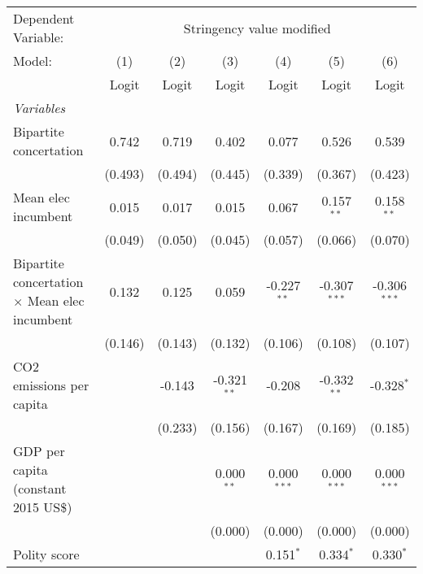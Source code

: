 
\begingroup
\centering
\begin{tabular}{lcccccc}
   \toprule
   Dependent Variable: & \multicolumn{6}{c}{Stringency value modified}\\
   Model:                                               & (1)     & (2)     & (3)           & (4)           & (5)            & (6)\\  
                                                        &  Logit  & Logit   & Logit         & Logit         & Logit          & Logit\\  
   \midrule
   \emph{Variables}\\
   Bipartite concertation                               & 0.742   & 0.719   & 0.402         & 0.077         & 0.526          & 0.539\\   
                                                        & (0.493) & (0.494) & (0.445)       & (0.339)       & (0.367)        & (0.423)\\   
   Mean elec incumbent                                  & 0.015   & 0.017   & 0.015         & 0.067         & 0.157$^{**}$   & 0.158$^{**}$\\   
                                                        & (0.049) & (0.050) & (0.045)       & (0.057)       & (0.066)        & (0.070)\\   
   Bipartite concertation $\times$ Mean elec incumbent  & 0.132   & 0.125   & 0.059         & -0.227$^{**}$ & -0.307$^{***}$ & -0.306$^{***}$\\   
                                                        & (0.146) & (0.143) & (0.132)       & (0.106)       & (0.108)        & (0.107)\\   
   CO2 emissions per capita                             &         & -0.143  & -0.321$^{**}$ & -0.208        & -0.332$^{**}$  & -0.328$^{*}$\\   
                                                        &         & (0.233) & (0.156)       & (0.167)       & (0.169)        & (0.185)\\   
   GDP per capita (constant 2015 US\$)                  &         &         & 0.000$^{**}$  & 0.000$^{***}$ & 0.000$^{***}$  & 0.000$^{***}$\\   
                                                        &         &         & (0.000)       & (0.000)       & (0.000)        & (0.000)\\   
   Polity score                                         &         &         &               & 0.151$^{*}$   & 0.334$^{*}$    & 0.330$^{*}$\\   

\end{tabular}
